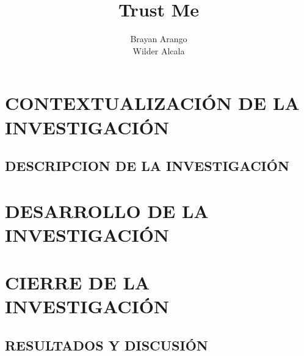 \documentclass[12pt,letterpaper,oneside]{report}
\title{Trust Me}
\author{{Brayan Arango} \\ {Wilder Alcala}}
\begin{document}
	
	
	

	
	
	
	\tableofcontents
	\listoffigures
	\listoftables
	
	
	
	\part{CONTEXTUALIZACIÓN DE LA INVESTIGACIÓN}
	
		\chapter{DESCRIPCION DE LA INVESTIGACIÓN}
			
			
			
			
			
			
			
			
	\part{DESARROLLO DE LA INVESTIGACIÓN}

			

	\part{CIERRE DE LA INVESTIGACIÓN}

		\chapter{RESULTADOS Y DISCUSIÓN}
\end{document}
